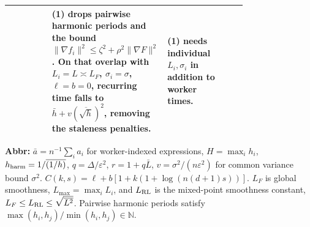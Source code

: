 \begin{table}[tp]
\begin{threeparttable}
\begin{tabularx}{\linewidth}{@{}>{\raggedright\arraybackslash}p{0.18\linewidth}>{\raggedright\arraybackslash}p{0.30\linewidth}>{\raggedright\arraybackslash}p{0.29\linewidth}>{\raggedright\arraybackslash}X@{}}
& \textbf{(1)} drops pairwise harmonic periods and the bound $\|\nabla f_i\|^2\le\zeta^2+\rho^2\|\nabla F\|^2$. On that overlap with $L_i=L\asymp L_F$, $\sigma_i=\sigma$, $\ell=b=0$, recurring time falls to $\bar h+v(\overline{\sqrt h})^2$, removing the staleness penalties.
& \textbf{(1)} needs individual $L_i,\sigma_i$ in addition to worker times. \\
\bottomrule
\end{tabularx}
\begin{tablenotes}[flushleft]\footnotesize
\item[] \textbf{Abbr:} $\bar a=n^{-1}\sum_i a_i$ for worker-indexed expressions, $H=\max_i h_i$, $h_{\rm harm}=1/\overline{(1/h)}$, $q=\Delta/\varepsilon^2$, $r=1+q\bar L$, $v=\sigma^2/(n\varepsilon^2)$ for common variance bound $\sigma^2$.
$C(k,s)=\ell+b[1+k(1+\log(n(d+1)s))]$. $L_F$ is global smoothness, $L_{\max}=\max_i L_i$, and $L_{\rm RL}$ is the mixed-point smoothness constant, $L_F\le L_{\rm RL}\le\sqrt{\overline{L^2}}$. Pairwise harmonic periods satisfy $\max(h_i,h_j)/\min(h_i,h_j)\in\mathbb N$.
\end{tablenotes}
\end{threeparttable}
\end{table}
